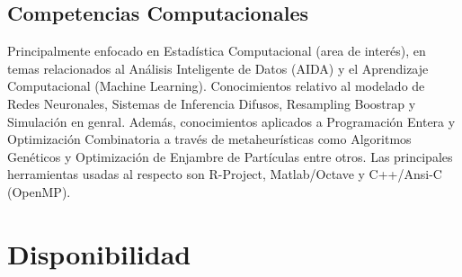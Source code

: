 \documentclass[11pt,letterpaper,roman]{moderncv}
\begin{document}
\subsection{Competencias Computacionales}  {Principalmente enfocado en Estadística Computacional (area de
interés), en temas relacionados al Análisis Inteligente de Datos (AIDA) y el
Aprendizaje Computacional (Machine Learning). Conocimientos relativo al modelado
de Redes Neuronales, Sistemas de Inferencia Difusos, Resampling Boostrap y
Simulación en genral. Además, conocimientos aplicados a Programación Entera y
Optimización Combinatoria a través de metaheurísticas como Algoritmos Genéticos
y Optimización de Enjambre de Partículas entre otros. Las principales
herramientas usadas al respecto son R-Project, Matlab/Octave y C++/Ansi-C
(OpenMP).}

\section{Disponibilidad}  
\end{document}

